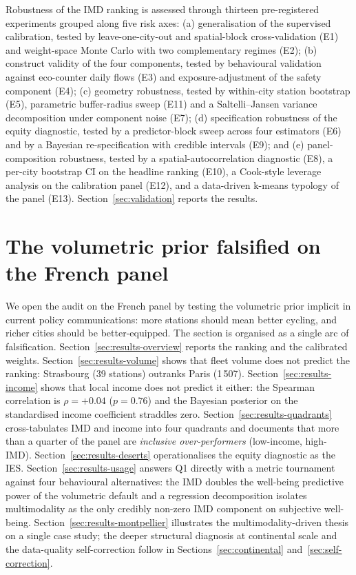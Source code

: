\documentclass[11pt,a4paper]{article}
\begin{document}
Robustness of the IMD ranking is assessed through thirteen
pre-registered experiments grouped along five risk axes: (a)
generalisation of the supervised calibration, tested by
leave-one-city-out and spatial-block cross-validation (E1) and
weight-space Monte Carlo with two complementary regimes (E2);
(b) construct validity of the four components, tested by
behavioural validation against eco-counter daily flows (E3) and
exposure-adjustment of the safety component (E4); (c) geometry
robustness, tested by within-city station bootstrap (E5),
parametric buffer-radius sweep (E11) and a Saltelli--Jansen
variance decomposition under component noise (E7); (d)
specification robustness of the equity diagnostic, tested by a
predictor-block sweep across four estimators (E6) and by a
Bayesian re-specification with credible intervals (E9); and (e)
panel-composition robustness, tested by a spatial-autocorrelation
diagnostic (E8), a per-city bootstrap CI on the headline
ranking (E10), a Cook-style leverage analysis on the calibration
panel (E12), and a data-driven k-means typology of the panel
(E13). Section~\ref{sec:validation} reports the results.

\section{The volumetric prior falsified on the French panel}
\label{sec:results}

We open the audit on the French panel by testing the volumetric
prior implicit in current policy communications: more stations
should mean better cycling, and richer cities should be
better-equipped. The section is organised as a single arc of
falsification. Section~\ref{sec:results-overview} reports the
ranking and the calibrated weights. Section~\ref{sec:results-volume}
shows that fleet volume does not predict the ranking: Strasbourg
(39 stations) outranks Paris (1\,507). Section~\ref{sec:results-income}
shows that local income does not predict it either: the Spearman
correlation is $\rho = +0.04$ ($p = 0.76$) and the Bayesian
posterior on the standardised income coefficient straddles zero.
Section~\ref{sec:results-quadrants} cross-tabulates IMD and
income into four quadrants and documents that more than a
quarter of the panel are \emph{inclusive over-performers}
(low-income, high-IMD). Section~\ref{sec:results-deserts}
operationalises the equity diagnostic as the IES.
Section~\ref{sec:results-usage} answers Q1 directly with a
metric tournament against four behavioural alternatives:
the IMD doubles the well-being predictive power of the
volumetric default and a regression decomposition isolates
multimodality as the only credibly non-zero IMD component on
subjective well-being. Section~\ref{sec:results-montpellier}
illustrates the multimodality-driven thesis on a single case
study; the deeper structural diagnosis at continental scale and
the data-quality self-correction follow in
Sections~\ref{sec:continental} and~\ref{sec:self-correction}.
\end{document}
